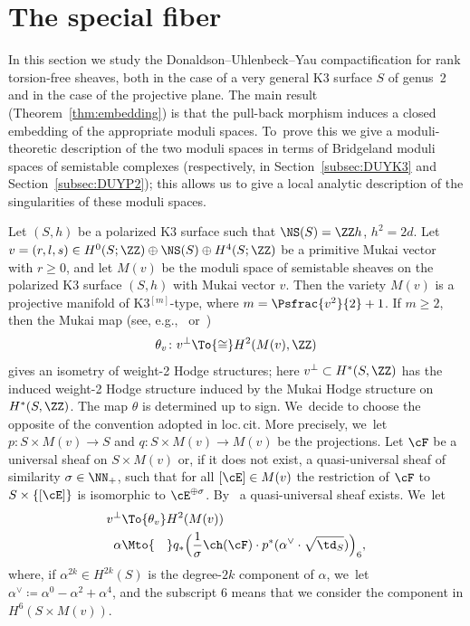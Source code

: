 \section{The special fiber}\label{sec:SpecialFiber}

In this section we study the Donaldson--Uhlenbeck--Yau compactification for rank torsion-free sheaves, both in the case of a very general K3 surface $S$ of genus~2 and in the case of the projective plane. The main result (Theorem~\ref{thm:embedding}) is that the pull-back morphism induces a closed embedding of the appropriate moduli spaces. To~prove this we give a moduli-theoretic description of the two moduli spaces in terms of Bridgeland moduli spaces of semistable complexes (respectively, in Section~\ref{subsec:DUYK3} and Section~\ref{subsec:DUYP2}); this allows us to give a local analytic description of the singularities of these moduli spaces.

\label{subsec:DUYK3}

Let $(S,h)$ be a polarized K3 surface such that $\NS(S)=\ZZ h$, $h^2=2d$. Let $v=(r,l,s)\in H^0(S;\ZZ)\oplus\NS(S)\oplus H^4(S;\ZZ)$ be a primitive Mukai vector with $r\ge 0$, and let $M(v)$ be the moduli space of semistable sheaves on the polarized K3 surface $(S,h)$ with Mukai vector $v$.
Then the variety $M(v)$ is a projective \HK manifold of K3$^{[m]}$-type, where $m=\Psfrac{v^2}{2}+1$.
If $m\geq2$, then the Mukai map (see, e.g.,~\cite[Main\,Th.\,]{Kieran:weight2} or~\cite[Eq.\,(1.6)]{Yos:moduli})
\[
\theta_v\colon v^\perp \To{\cong} H^2(M(v),\ZZ)
\]
gives an isometry of weight-2 Hodge structures; here $v^\perp\subset H^*(S,\ZZ)$ has the induced weight-2 Hodge structure induced by the Mukai Hodge structure on $H^*(S,\ZZ)$. The map $\theta$ is determined up to sign. We~decide to choose the opposite of the convention adopted in loc.\,cit.
More precisely, we~let $p\colon S\times M(v)\to S$ and $q\colon S\times M(v)\to M(v)$ be the projections. Let $\cF$ be a universal sheaf on $S\times M(v)$ or, if it does not exist, a quasi-universal sheaf of similarity $\sigma\in\NN_{+}$, \ie such that for all $[\cE]\in M(v)$ the restriction of $\cF$ to $S\times\{[\cE]\}$ is isomorphic to $\cE^{\oplus\sigma}$. By~\cite[Th.\,A.5]{Mukai:Tata}
a quasi-universal sheaf exists. We~let
\begin{equation}\label{mappatheta}
\begin{aligned}
v^{\bot} & \To{\theta_v} H^2(M(v)) \\
\alpha & \Mto{\hphantom{\theta_v}} q_{*}\Bigl(\frac{1}{\sigma}\ch(\cF)\cdot p^{*}(\alpha^{\vee}\cdot\sqrt{\td_S})\Bigr)_6,
\end{aligned}
\end{equation}
where, if $\alpha^{2k}\in H^{2k}(S)$ is the degree-$2k$ component of $\alpha$, we~let
$\alpha^{\vee}\coloneqq \alpha^0-\alpha^2+\alpha^4$, and the subscript $6$ means that we consider the component in $H^6(S\times M(v))$.

